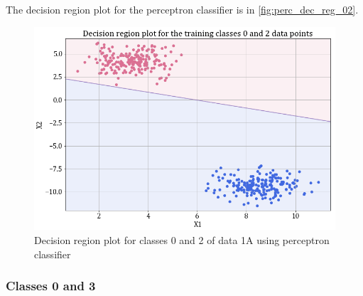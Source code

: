 \documentclass[11pt,a4paper]{article}
\newcommand{\noi}{\noindent}
\begin{document}
\noi
The decision region plot for the perceptron classifier is in \autoref{fig:perc_dec_reg_02}.
\begin{figure}[H]
    \centering
    \includegraphics[scale=0.45]{images/1A_perceptron_training_classes_0_and_2_dec_reg.png}
    \caption{Decision region plot for classes 0 and 2 of data 1A using perceptron classifier}
    \label{fig:perc_dec_reg_02}
\end{figure}

\subsubsection{Classes 0 and 3}

\end{document}

